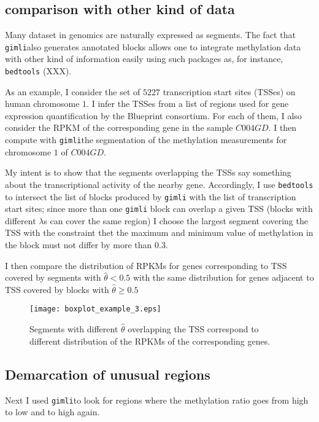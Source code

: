 \documentclass[12pt]{amsart}
\newcommand{\gimli}{\texttt{gimli}}
\begin{document}
\subsection{comparison with other kind of data}

Many dataset in genomics are naturally expressed as segments. The
fact that \gimli also generates annotated blocks allows one to
integrate methylation data with other kind of information easily
using such packages as, for instance, \texttt{bedtools} (XXX).

As an example, I consider the set of $5227$ transcription start sites
(TSSes) on human chromosome $1$. I infer the TSSes from a list of 
regions used for gene expression quantification by the Blueprint 
consortium. For each of them, I also consider the RPKM of the corresponding
gene in the sample $C004GD$. I then compute with \gimli the segmentation
of the methylation measurements for chromosome $1$ of $C004GD$.

My intent is to show that the segments overlapping the TSSs
say something about the transcriptional activity of the nearby gene.
Accordingly,
I use \texttt{bedtools} to intersect the list of blocks produced by \gimli
with the list of transcription start sites; since more than one \gimli
block can overlap a given TSS (blocks with different $\lambda$s can 
cover the same region) I choose the largest segment covering the TSS
with the constraint thet the maximum and minimum value of methylation
in the block must not differ by more than $0.3$.

I then compare the distribution of RPKMs for genes corresponding
to TSS covered by segments with $\hat{\theta}<0.5$ with the same distribution
for genes adjacent to TSS covered by blocks with $\hat{\theta} \geq 0.5$

\begin{figure}\label{ex3}
\texttt{[image: boxplot\_example\_3.eps]}
\caption{Segments with different $\hat{\theta}$ overlapping the TSS correspond
to different distribution of the RPKMs of the corresponding genes.}
\end{figure}

\subsection{Demarcation of unusual regions} 

Next I used \gimli  to look for regions where the 
methylation
ratio goes from high to low and to high again.
\end{document}
